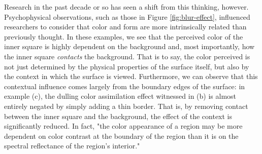 \documentclass[journal,onecolumn]{IEEEtran}
\begin{document}
Research in the past decade or so has seen a shift from this thinking, however. Psychophysical observations, such as those in Figure \ref{fig:blur-effect}, influenced researchers to consider that color and form are more intrinsically related than previously thought. In these examples, we see that the perceived color of the inner square is highly dependent on the background and, most importantly, how the inner square \textit{contacts} the background. That is to say, the color perceived is not just determined by the physical properties of the surface itself, but also by the context in which the surface is viewed. Furthermore, we can observe that this contextual influence comes largely from the boundary edges of the surface: in example (c), the dulling color assimilation effect witnessed in (b) is almost entirely negated by simply adding a thin border. That is, by removing contact between the inner square and the background, the effect of the context is significantly reduced. In fact, "the color appearance of a region may be more dependent on color contrast at the boundary of the region than it is on the spectral reflectance of the region's interior." \cite[p.572]{chualupa:encyclopedia}
\end{document}
